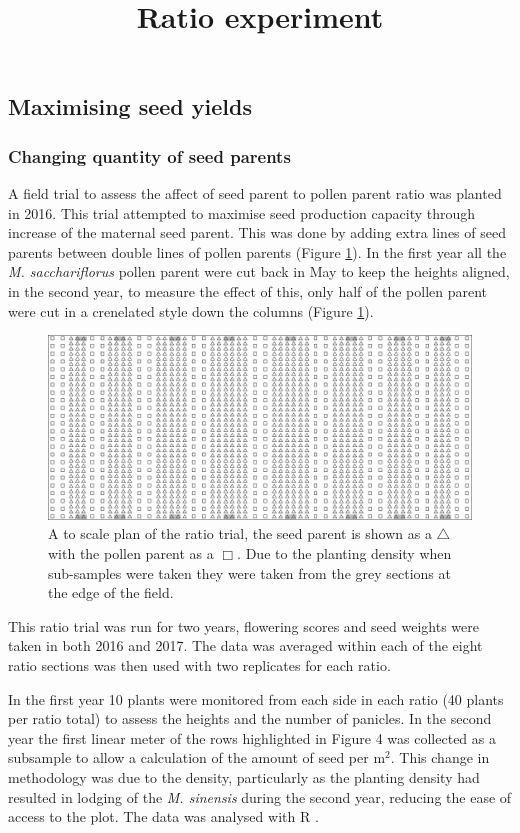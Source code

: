 \documentclass[fleqn, 15pt, lineno]{olplainarticle}
\begin{document}
\FloatBarrier
\subsection{Maximising seed yields}
\subsubsection{Changing quantity of seed parents}

\title{Ratio experiment}

A field trial to assess the affect of seed parent to pollen parent ratio was planted in 2016. 
This trial attempted to maximise seed production capacity through increase of the maternal seed parent.
This was done by adding extra lines of seed parents between double lines of pollen parents (Figure \ref{fig:RatioPlan}).
In the first year all the \textit{M. sacchariflorus} pollen parent were cut back in May to keep the heights aligned, in the second year, to measure the effect of this, only half of the pollen parent were cut in a crenelated style down the columns (Figure \ref{fig:RatioPlan}).

\begin{figure}
\centering
\includegraphics[width=1\textwidth]{Figs/CAT22Plan}
\caption{\label{fig:RatioPlan} A to scale plan of the ratio trial, the seed parent is shown as a $\bigtriangleup$ with the pollen parent as a $\Box$.
Due to the planting density when sub-samples were taken they were taken from the grey sections at the edge of the field.}
\end{figure}

This ratio trial was run for two years, flowering scores and seed weights were taken in both 2016 and 2017.
The data was averaged within each of the eight ratio sections was then used with two replicates for each ratio.

In the first year 10 plants were monitored from each side in each ratio (40 plants per ratio total) to assess the heights and the number of panicles.
In the second year the first linear meter of the rows highlighted in Figure 4 was collected as a subsample to allow a calculation of the amount of seed per m$^2$.
This change in methodology was due to the density, particularly as the planting density had resulted in lodging of the \textit{M. sinensis} during the second year, reducing the ease of access to the plot.
The data was analysed with R \citep{RCoreTeam2015}.
\end{document}
